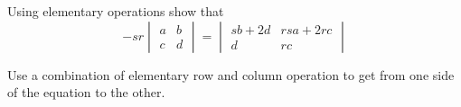 
\begin{Exercise}[
name={},
title={}, 
difficulty=0,
origin={\cite{YL}}]
Using elementary operations show that
\[
-sr\begin{vmatrix}
a & b\\
c & d
\end{vmatrix}
=
\begin{vmatrix}
sb+2d & rsa+2rc\\
d & rc
\end{vmatrix}
\]
\end{Exercise}

\begin{Answer}
Use a combination of elementary row and column operation to get from one side of the equation to the other.
\end{Answer}
